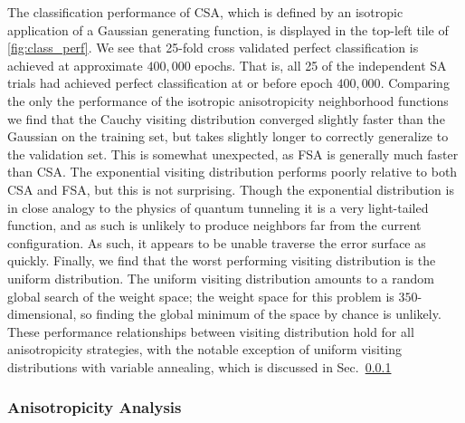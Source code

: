 \documentclass[10pt,journal,cspaper,compsoc]{IEEEtran}
\begin{document}
The classification performance of CSA, which is defined by an isotropic application of a Gaussian generating function, is displayed in the top-left tile of \ref{fig:class_perf}. We see that 25-fold cross validated perfect classification is achieved at approximate $400,000$ epochs. That is, all 25 of the independent SA trials had achieved perfect classification at or before epoch $400,000$. Comparing the only the performance of the isotropic anisotropicity neighborhood functions we find that the Cauchy visiting distribution converged slightly faster than the Gaussian on the training set, but takes slightly longer to correctly generalize to the validation set. This is somewhat unexpected, as FSA is generally much faster than CSA. The exponential visiting distribution performs poorly relative to both CSA and FSA, but this is not surprising. Though the exponential distribution is in close analogy to the physics of quantum tunneling it is a very light-tailed function, and as such is unlikely to produce neighbors far from the current configuration. As such, it appears to be unable traverse the error surface as quickly. Finally, we find that the worst performing visiting distribution is the uniform distribution. The uniform visiting distribution amounts to a random global search of the weight space; the weight space for this problem is $350$-dimensional, so finding the global minimum of the space by chance is unlikely. These performance relationships between visiting distribution hold for all anisotropicity strategies, with the notable exception of uniform visiting distributions with variable annealing, which is discussed in Sec.~\ref{scn:anisotropicity_analysis}

\subsubsection{Anisotropicity Analysis}
\label{scn:anisotropicity_analysis}
\end{document}
